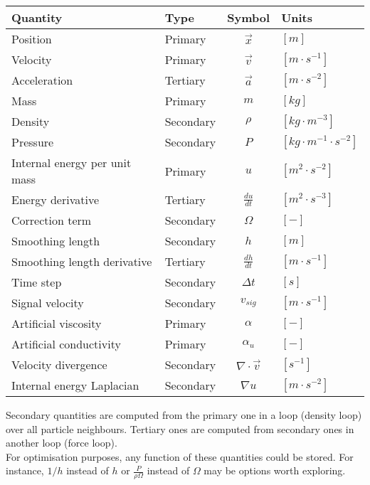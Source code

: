 \documentclass[a4paper,10pt]{report}
\begin{document}
\begin{table}[h]
\centering
\begin{tabular}{|l|l|c|l|}
 \hline
 \textbf{Quantity} & \textbf{Type} & \textbf{Symbol} & \textbf{Units} \\
 \hline \hline
 Position & Primary & $\vec{x}$ & $[m]$ \\
 Velocity & Primary &$\vec{v}$ & $[m\cdot s^{-1}]$ \\
 Acceleration & Tertiary &$\vec{a}$ & $[m\cdot s^{-2}]$ \\
 Mass & Primary &$m$ & $[kg]$ \\
 Density & Secondary & $\rho$ & $[kg\cdot m^{-3}]$ \\
 Pressure & Secondary & $P$ & $[kg \cdot m^{-1}\cdot s^{-2}]$ \\
 Internal energy per unit mass & Primary & $u$ & $[m^2 \cdot s^{-2}]$ \\ 
 Energy derivative & Tertiary & $\frac{du}{dt}$ & $[ m^2 \cdot s^{-3}]$ \\
 Correction term & Secondary & $\Omega$ & $[-]$ \\
 Smoothing length & Secondary &$h$ & $[m]$ \\
 Smoothing length derivative & Tertiary &$\frac{dh}{dt}$ & $[m\cdot s^{-1}]$ \\
 Time step & Secondary & $\Delta t$ & $[s]$ \\
 Signal velocity & Secondary & $v_{sig}$& $[m\cdot s^{-1}]$ \\
\hline
 Artificial viscosity & Primary & $\alpha$ & $[-]$\\
 Artificial conductivity & Primary & $\alpha_u$ & $[-]$\\
 Velocity divergence & Secondary & $\nabla\cdot \vec{v}$ & $[s^{-1}]$ \\
 Internal energy Laplacian & Secondary & $\nabla u$ & $[m\cdot s^{-2}]$\\
\hline
\end{tabular} 
\end{table}

Secondary quantities are computed from the primary one in a loop (density loop) over all particle neighbours. Tertiary
ones are computed from secondary ones in another loop (force loop). \\

For optimisation purposes, any function of these quantities could be stored. For instance, $1/h$ instead of $h$ or
$\frac{P}{\rho\Omega}$ instead of $\Omega$ may be options worth exploring. \\
\end{document}
